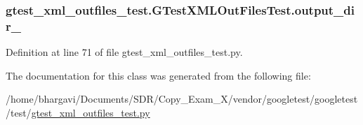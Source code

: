 \subsubsection[{\texorpdfstring{output\+\_\+dir\+\_\+}{output_dir_}}]{\setlength{\rightskip}{0pt plus 5cm}gtest\+\_\+xml\+\_\+outfiles\+\_\+test.\+G\+Test\+X\+M\+L\+Out\+Files\+Test.\+output\+\_\+dir\+\_\+}\hypertarget{classgtest__xml__outfiles__test_1_1_g_test_x_m_l_out_files_test_aa5c31cd97047bc1d3060f4d27bc956a4}{}\label{classgtest__xml__outfiles__test_1_1_g_test_x_m_l_out_files_test_aa5c31cd97047bc1d3060f4d27bc956a4}


Definition at line 71 of file gtest\+\_\+xml\+\_\+outfiles\+\_\+test.\+py.



The documentation for this class was generated from the following file\+:\begin{DoxyCompactItemize}
\item 
/home/bhargavi/\+Documents/\+S\+D\+R/\+Copy\+\_\+\+Exam\+\_\+X/vendor/googletest/googletest/test/\hyperlink{gtest__xml__outfiles__test_8py}{gtest\+\_\+xml\+\_\+outfiles\+\_\+test.\+py}\end{DoxyCompactItemize}
